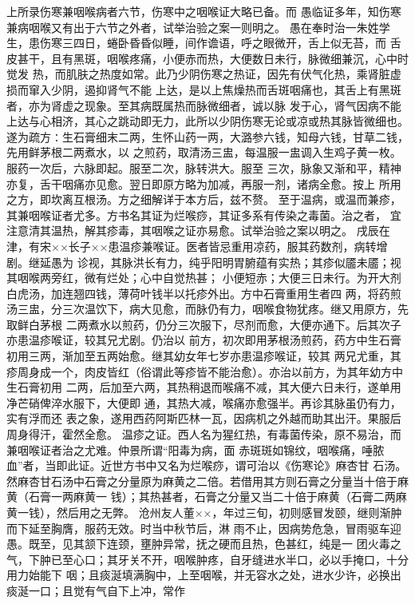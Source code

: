 \documentclass[a4paper,12pt,UTF8,twoside]{ctexbook}
\begin{document}
上所录伤寒兼咽喉病者六节，伤寒中之咽喉证大略已备。而 
愚临证多年，知伤寒兼病咽喉又有出于六节之外者，试举治验之案一则明之。 
愚在奉时治一朱姓学生，患伤寒三四日，蜷卧昏昏似睡，间作谵语，呼之眼微开，舌上似无苔，而 
舌皮甚干，且有黑斑，咽喉疼痛，小便赤而热，大便数日未行，脉微细兼沉，心中时觉发 
热，而肌肤之热度如常。此乃少阴伤寒之热证，因先有伏气化热，乘肾脏虚损而窜入少阴，遏抑肾气不能 
上达，是以上焦燥热而舌斑咽痛也，其舌上有黑斑者，亦为肾虚之现象。至其病既属热而脉微细者，诚以脉 
发于心，肾气因病不能上达与心相济，其心之跳动即无力，此所以少阴伤寒无论或凉或热其脉皆微细也。 
遂为疏方∶生石膏细末二两，生怀山药一两，大潞参六钱，知母六钱，甘草二钱，先用鲜茅根二两煮水，以 
之煎药，取清汤三盅，每温服一盅调入生鸡子黄一枚。服药一次后，六脉即起。服至二次，脉转洪大。服至 
三次，脉象又渐和平，精神亦复，舌干咽痛亦见愈。翌日即原方略为加减，再服一剂，诸病全愈。按上 
所用之方，即坎离互根汤。方之细解详于本方后，兹不赘。 
至于温病，或温而兼疹，其兼咽喉证者尤多。方书名其证为烂喉痧，其证多系有传染之毒菌。治之者， 
宜注意清其温热，解其疹毒，其咽喉之证亦易愈。试举治验之案以明之。 
戌辰在津，有宋××长子××患温疹兼喉证。医者皆忌重用凉药，服其药数剂，病转增剧。继延愚为 
诊视，其脉洪长有力，纯乎阳明胃腑蕴有实热；其疹似靥未靥；视其咽喉两旁红，微有烂处；心中自觉热甚； 
小便短赤；大便三日未行。为开大剂白虎汤，加连翘四钱，薄荷叶钱半以托疹外出。方中石膏重用生者四 
两，将药煎汤三盅，分三次温饮下，病大见愈，而脉仍有力，咽喉食物犹疼。继又用原方，先取鲜白茅根 
二两煮水以煎药，仍分三次服下，尽剂而愈，大便亦通下。后其次子亦患温疹喉证，较其兄尤剧。仍治以 
前方，初次即用茅根汤煎药，药方中生石膏初用三两，渐加至五两始愈。继其幼女年七岁亦患温疹喉证，较其 
两兄尤重，其疹周身成一个，肉皮皆红（俗谓此等疹皆不能治愈）。亦治以前方，为其年幼方中生石膏初用 
二两，后加至六两，其热稍退而喉痛不减，其大便六日未行，遂单用净芒硝俾淬水服下，大便即 
通，其热大减，喉痛亦愈强半。再诊其脉虽仍有力，实有浮而还 
表之象，遂用西药阿斯匹林一瓦，因病机之外越而助其出汗。果服后周身得汗，霍然全愈。 
温疹之证。西人名为猩红热，有毒菌传染，原不易治，而兼咽喉证者治之尤难。仲景所谓“阳毒为病，面 
赤斑斑如锦纹，咽喉痛，唾脓血”者，当即此证。近世方书中又名为烂喉痧，谓可治以《伤寒论》麻杏甘 
石汤。然麻杏甘石汤中石膏之分量原为麻黄之二倍。若借用其方则石膏之分量当十倍于麻黄（石膏一两麻黄一 
钱）；其热甚者，石膏之分量又当二十倍于麻黄（石膏二两麻黄一钱），然后用之无弊。 
沧州友人董××，年过三旬，初则感冒发颐，继则渐肿而下延至胸膺，服药无效。时当中秋节后，淋 
雨不止，因病势危急，冒雨驱车迎愚。既至，见其颔下连颈，壅肿异常，抚之硬而且热，色甚红，纯是一 
团火毒之气，下肿已至心口；其牙关不开，咽喉肿疼，自牙缝进水半口，必以手掩口，十分用力始能下 
咽；且痰涎填满胸中，上至咽喉，并无容水之处，进水少许，必换出痰涎一口；且觉有气自下上冲，常作 
\end{document}
